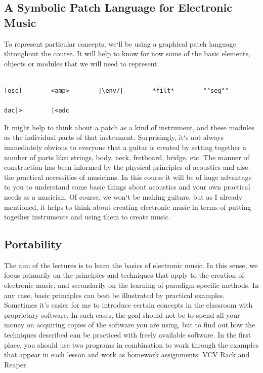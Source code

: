 \documentclass[11pt]{article}
\begin{document}
\subsection{A Symbolic Patch Language for Electronic Music}
\label{sec:org0686842}

To represent particular concepts, we‘ll be using a graphical patch
language  throughout the course. It will help to know for now some of
the basic elements, objects or modules that we will need to
represent. 

\begin{verbatim}

[osc]        <amp>        |\env/|        *filt*        °°seq°°        

dac|>        |<adc

\end{verbatim}


It might help to think about a patch as a kind of instrument, and these modules as the individual parts of that instrument. Surprisingly, it‘s not always immediately obvious to everyone that a guitar is created by setting together a number of parts like: strings, body, neck, fretboard, bridge, etc. The manner of construction has been informed by the physical principles of acoustics and also the practical necessities of musicians. In this course it will be of huge advantage to you to understand some basic things about acoustics and your own practical needs as a musician. Of course, we won‘t be making guitars, but as I already mentioned, it helps to think about creating electronic music in terms of putting together instruments and using them to create music. 

\subsection{Portability}
\label{sec:org3961620}
The aim of the lectures is to learn the basics of electronic music. In this sense, we focus primarily on the principles and techniques that apply to the creation of electronic music, and secondarily on the learning of paradigm-specific methods.
In any case, basic principles can best be illustrated by practical examples. Sometimes it's easier for me to introduce certain concepts in the classroom with proprietary software. In such cases, the goal should not be to spend all your money on acquiring copies of the software you are using, but to find out how the techniques described can be practiced with freely available software. In the first place, you should use two programs in combination to work through the examples that appear in each lesson and work as homework assignments: VCV Rack and Reaper. 
\end{document}
